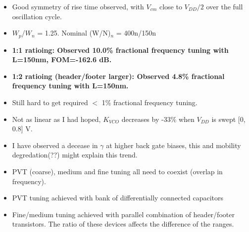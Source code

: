 			\begin{itemize}[itemsep=4pt,label=\protect---]
				\item Good symmetry of rise time observed, with $V_{cm}$ close to $V_{DD}/2$ over the full oscillation cycle.
				\item $W_p$/$W_n$ = 1.25. Nominal (W/N)$_n$ = 400n/150n
				\item \textbf{1:1 ratioing: Observed 10.0\% fractional frequency tuning with L=150nm, {\color{red}FOM=-162.6 dB.}}
				\item \textbf{1:2 ratioing (header/footer larger): Observed 4.8\% fractional frequency tuning with L=150nm.}
				\item Still hard to get required $<$ 1\% fractional frequency tuning.
			\end{itemize}




			\begin{itemize}[itemsep=4pt,label=\protect---]
				\item Not as linear as I had hoped, $K_{VCO}$ decreases by -33\% when $V_{DD}$ is swept [0, 0.8] V.
				\item I have observed a decease in $\gamma$ at higher back gate biases, this and mobility degredation(??) might explain this trend.
			\end{itemize}



			\begin{itemize}[itemsep=4pt,label=\protect---]
				\item PVT (coarse), medium and fine tuning all need to coexist (overlap in frequency).
				\item PVT tuning achieved with bank of differentially connected capacitors
				\item Fine/medium tuning achieved with parallel combination of header/footer transistors. The ratio of these devices affects the difference of the ranges.

			\end{itemize}


